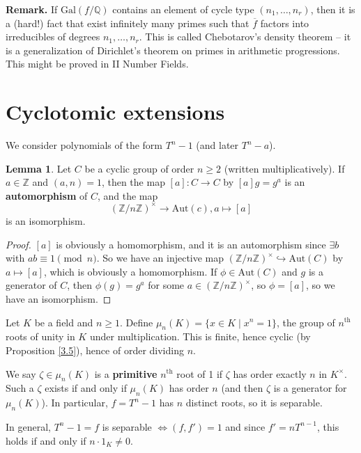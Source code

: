 \documentclass{article}
\theoremstyle{definition}
\newtheorem{lemma}[theorem]{Lemma}
\begin{document}
\textbf{Remark.} If $\text{Gal}(f/\mathbb{Q})$ contains an element of cycle type $(n_1,\ldots,n_r)$, then it is a (hard!) fact that exist infinitely many primes such that $\overline{f}$ factors into irreducibles of degrees $n_1,\ldots,n_r$. This is called Chebotarov's density theorem -- it is a generalization of Dirichlet's theorem on primes in arithmetic progressions. This might be proved in II Number Fields.

\section{Cyclotomic extensions}
We consider polynomials of the form $T^n-1$ (and later $T^n-a$).

\begin{lemma}\label{11.1}
    Let $C$ be a cyclic group of order $n \ge 2$ (written multiplicatively). If $a \in \mathbb{Z}$ and $(a,n)=1$, then the map $[a] : C \to C$ by $[a]g=g^a$ is an \textbf{automorphism} of $C$, and the map $$(\mathbb{Z}/n\mathbb{Z})^{\times} \to \text{Aut}(c), a \mapsto [a]$$ is an isomorphism.
\end{lemma}
\begin{proof}
    $[a]$ is obviously a homomorphism, and it is an automorphism since $\exists b$ with $ab \equiv 1 \pmod{n}$. So we have an injective map $(\mathbb{Z}/n\mathbb{Z})^{\times} \hookrightarrow \text{Aut}(C)$ by $a \mapsto [a]$, which is obviously a homomorphism. If $\phi \in \text{Aut}(C)$ and $g$ is a generator of $C$, then $\phi(g)=g^a$ for some $a \in (\mathbb{Z}/n\mathbb{Z})^{\times}$, so $\phi = [a]$, so we have an isomorphism.
\end{proof}


Let $K$ be a field and $n\ge 1$. Define $\mu_n(K)= \{x \in K \mid x^n=1\}$, the group of $n^{\text{th}}$ roots of unity in $K$ under multiplication. This is finite, hence cyclic (by Proposition \ref{3.5}), hence of order dividing $n$.
\vspace{1mm}

We say $\zeta \in \mu_n(K)$ is a \textbf{primitive} $n^{\text{th}}$ root of 1 if $\zeta$ has order exactly $n$ in $K^{\times}$. Such a $\zeta$ exists if and only if $\mu_n(K)$ has order $n$ (and then $\zeta$ is a generator for $\mu_n(K)$). In particular, $f=T^n-1$ has $n$ distinct roots, so it is separable.
\vspace{1mm}

In general, $T^n-1=f$ is separable $\iff (f,f')=1$ and since $f'=nT^{n-1}$, this holds if and only if $n\cdot 1_K \neq 0$.
\vspace{1mm}
\end{document}
